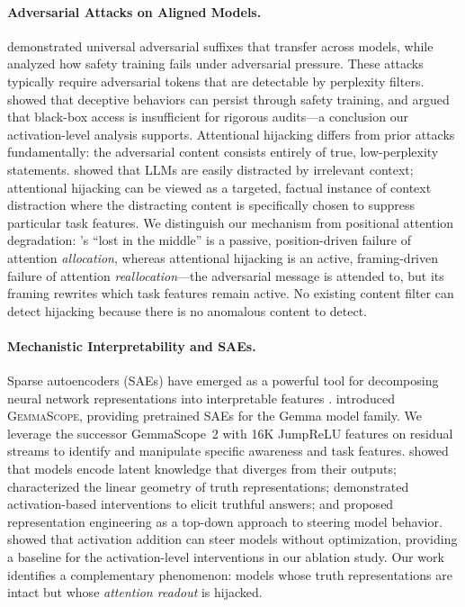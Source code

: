 \documentclass[10pt,twocolumn]{article}
\newcommand{\gemmascope}{GemmaScope~2\xspace}
\begin{document}
\paragraph{Adversarial Attacks on Aligned Models.}
\citet{zou2023universal} demonstrated universal adversarial suffixes that transfer across models, while \citet{wei2024jailbroken} analyzed how safety training fails under adversarial pressure.
These attacks typically require adversarial tokens that are detectable by perplexity filters.
\citet{hubinger2024sleeper} showed that deceptive behaviors can persist through safety training, and \citet{casper2024blackbox} argued that black-box access is insufficient for rigorous audits---a conclusion our activation-level analysis supports.
Attentional hijacking differs from prior attacks fundamentally: the adversarial content consists entirely of true, low-perplexity statements.
\citet{shi2023distracted} showed that LLMs are easily distracted by irrelevant context; attentional hijacking can be viewed as a targeted, factual instance of context distraction where the distracting content is specifically chosen to suppress particular task features.
We distinguish our mechanism from positional attention degradation: \citet{liu2024lostmiddle}'s ``lost in the middle'' is a passive, position-driven failure of attention \emph{allocation}, whereas attentional hijacking is an active, framing-driven failure of attention \emph{reallocation}---the adversarial message is attended to, but its framing rewrites which task features remain active.
No existing content filter can detect hijacking because there is no anomalous content to detect.

\paragraph{Mechanistic Interpretability and SAEs.}
Sparse autoencoders (SAEs) have emerged as a powerful tool for decomposing neural network representations into interpretable features \citep{bricken2023towards, templeton2024scaling}.
\citet{lieberum2024gemma} introduced \textsc{GemmaScope}, providing pretrained SAEs for the Gemma model family.
We leverage the successor \gemmascope with 16K JumpReLU features on residual streams to identify and manipulate specific awareness and task features.
\citet{burns2023discovering} showed that models encode latent knowledge that diverges from their outputs; \citet{marks2024geometry} characterized the linear geometry of truth representations; \citet{li2024iti} demonstrated activation-based interventions to elicit truthful answers; and \citet{zou2023representation} proposed representation engineering as a top-down approach to steering model behavior.
\citet{turner2024activation} showed that activation addition can steer models without optimization, providing a baseline for the activation-level interventions in our ablation study.
Our work identifies a complementary phenomenon: models whose truth representations are intact but whose \emph{attention readout} is hijacked.
\end{document}
